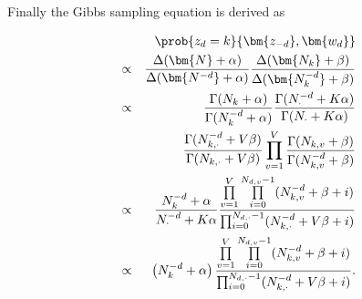 \begin{appendix}
Finally the Gibbs sampling equation is derived as

\begin{eqnarray}
&&\prob {z_{d}=k} {\bm{z_{-d}},\bm{w_d}} \notag \\
&\propto& \frac {\Delta(\bm{N}+\alpha)} {\Delta(\bm{N^{-d}}+\alpha)} \frac {\Delta(\bm{N_k}+\beta)} {\Delta(\bm{N_k^{-d}}+\beta)}\\
&\propto& \frac {\Gamma(N_k+\alpha)} {\Gamma(N_k^{-d}+\alpha)} \frac {\Gamma(N_{\cdot}^{-d}+K\alpha)} {\Gamma(N_{\cdot}+K\alpha)} \notag \\
&&\frac {\Gamma(N_{k,\cdot}^{-d}+V\beta)} {\Gamma(N_{k,\cdot}+V\beta)} \prod_{v=1}^{V} \frac {\Gamma(N_{k,v}+\beta)} {\Gamma(N_{k,v}^{-d}+\beta)}\\
&\propto& \frac {N_{k}^{-d}+\alpha} {N_{\cdot}^{-d}+K\alpha} \frac {\prod\limits_{v=1}^{V} \prod\limits_{i=0}^{N_{d,v}-1} (N_{k,v}^{-d}+\beta+i)} {\prod_{i=0}^{N_{d,\cdot}-1} (N_{k,\cdot}^{-d}+V\beta+i)}\\
&\propto& \left( N_{k}^{-d}+\alpha \right) \frac {\prod\limits_{v=1}^{V} \prod\limits_{i=0}^{N_{d,v}-1} (N_{k,v}^{-d}+\beta+i)} {\prod_{i=0}^{N_{d,\cdot}-1} (N_{k,\cdot}^{-d}+V\beta+i)}.
\end{eqnarray}

\end{appendix}